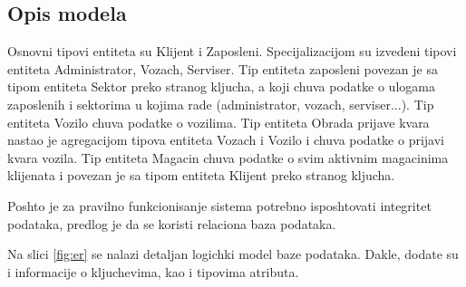 

\subsection{Opis modela}
Osnovni tipovi entiteta su Klijent i Zaposleni. Specijalizacijom su izvedeni tipovi entiteta Administrator, Vozach, Serviser. Tip entiteta zaposleni povezan je sa tipom entiteta Sektor preko stranog kljucha, a koji chuva podatke o ulogama zaposlenih i sektorima u kojima rade (administrator, vozach, serviser...). Tip entiteta Vozilo chuva podatke o vozilima. Tip entiteta Obrada prijave kvara nastao je agregacijom tipova entiteta Vozach i Vozilo i chuva podatke o prijavi kvara vozila. Tip entiteta Magacin chuva podatke o svim aktivnim magacinima klijenata i povezan je sa tipom entiteta Klijent preko stranog kljucha.

Poshto je za pravilno funkcionisanje sistema potrebno isposhtovati integritet podataka, predlog je da se koristi relaciona baza podataka.

Na slici \ref{fig:er} se nalazi detaljan logichki model baze podataka. Dakle, dodate su i informacije o kljuchevima, kao i tipovima atributa. 

